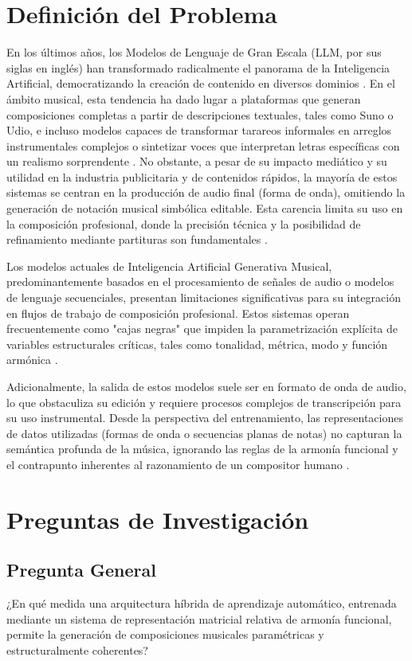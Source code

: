 \documentclass[12pt]{report}
\begin{document}
\section{Definición del Problema}
En los últimos años, los Modelos de Lenguaje de Gran Escala (LLM, por sus siglas en inglés) han transformado radicalmente el panorama de la Inteligencia Artificial, democratizando la creación de contenido en diversos dominios \cite{sengar2025}. En el ámbito musical, esta tendencia ha dado lugar a plataformas que generan composiciones completas a partir de descripciones textuales, tales como Suno o Udio, e incluso modelos capaces de transformar tarareos informales en arreglos instrumentales complejos o sintetizar voces que interpretan letras específicas con un realismo sorprendente \cite{wei2024}. No obstante, a pesar de su impacto mediático y su utilidad en la industria publicitaria y de contenidos rápidos, la mayoría de estos sistemas se centran en la producción de audio final (forma de onda), omitiendo la generación de notación musical simbólica editable. Esta carencia limita su uso en la composición profesional, donde la precisión técnica y la posibilidad de refinamiento mediante partituras son fundamentales \cite{batlle2024}.

Los modelos actuales de Inteligencia Artificial Generativa Musical, predominantemente basados en el procesamiento de señales de audio o modelos de lenguaje secuenciales, presentan limitaciones significativas para su integración en flujos de trabajo de composición profesional. Estos sistemas operan frecuentemente como "cajas negras" que impiden la parametrización explícita de variables estructurales críticas, tales como tonalidad, métrica, modo y función armónica \cite{fernandez2023}.

Adicionalmente, la salida de estos modelos suele ser en formato de onda de audio, lo que obstaculiza su edición y requiere procesos complejos de transcripción para su uso instrumental. Desde la perspectiva del entrenamiento, las representaciones de datos utilizadas (formas de onda o secuencias planas de notas) no capturan la semántica profunda de la música, ignorando las reglas de la armonía funcional y el contrapunto inherentes al razonamiento de un compositor humano \cite{kaliakatsos20}.

\section{Preguntas de Investigación}

\subsection{Pregunta General}
¿En qué medida una arquitectura híbrida de aprendizaje automático, entrenada mediante un sistema de representación matricial relativa de armonía funcional, permite la generación de composiciones musicales paramétricas y estructuralmente coherentes?
\end{document}
